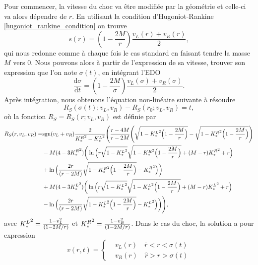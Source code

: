 \documentclass[11pt,a4paper]{article}
\begin{document}
Pour commencer, la vitesse du choc va être modifiée par la géométrie et celle-ci va alors dépendre de $r$. En utilisant la condition d'Hugoniot-Rankine \eqref{hugoniot_rankine_condition} on trouve
\begin{equation}
	s(r) = \left(1-\frac{2M}{r}\right)\frac{v_L(r)+v_R(r)}{2},
\end{equation}
qui nous redonne comme à chaque fois le cas standard en faisant tendre la masse $M$ vers $0$. Nous pouvons alors à partir de l'expression de sa vitesse, trouver son expression que l'on note $\sigma(t)$, en intégrant l'EDO
\begin{equation}
	\frac{\mathrm{d}\sigma}{\mathrm{d}t} = \left(1 - \frac{2M}{\sigma}\right) \frac{v_L(\sigma) + v_R(\sigma)}{2}.
\end{equation}
Après intégration, nous obtenons l'équation non-linéaire suivante à résoudre 
\begin{equation}
R_S(\sigma (t);  v_L, v_R)-  R_S(r_0;  v_L, v_R)= t,
\end{equation}
où la fonction $R_S= R_S(r; v_L, v_{R})$ est définie par  
  \begin{equation}\label{speed-3}
 \aligned 
  R_S(r,  v_L, v_{R})=&  \text{sgn}(v_L+ v_{R}) {2 \over {K_{*}^R}^2-{K_*^L}^2  } \Bigg( {r-4M \over r-2M }\Bigg(\sqrt {{1}- {K_*^L}^2\Big(1- {2M\over r}\Big) } -  \sqrt {{1}- {K_{*}^R}^2\Big(1- {2M\over r}\Big) }\Bigg )
 \\
 & - M({4}- 3{K_{*}^R}^2  )\bigg(  \ln \Big( r \sqrt {{1}- {K_*^L}^2}   \sqrt {{1}- {K_{*}^R}^2 \Big(1- {2M\over r}\Big)  } + ( M-r) {K_{*}^R}^2+{ r}  \Big )
 \\
& +\ln  \Big( {2 r \over (r-2M)}  \sqrt {{1}- {K_{*}^R}^2 \Big(1- {2M\over r}\Big)}- {K_{*}^R}^2\Big )\bigg)
\\
& + M({4}- 3{K_*^L}^2  )\bigg(  \ln \Big( r \sqrt {{1}- {K_*^L}^2}   \sqrt {{1}- {K_*^L}^2 \Big(1- {2M\over r}\Big)  } + ( M-r) {K_*^L}^2+{ r}  \Big )
 \\
& -\ln  \Big( {2 r \over (r-2M)}  \sqrt {{1}- {K_*^L}^2 \Big(1- {2M\over r}\Big)}- {K_*^L}^2\Big )\bigg)
\Bigg), 
 \endaligned 
\end{equation}
avec ${K_*^L}^2= {1 -v_L^2\over (1-2M/r)}$ et $ {K_{*}^R}^2= {1-v_{R}^2\over (1-2M/r)}$.
Dans le cas du choc, la solution a pour expression
\begin{equation}\label{solution_choc}
	v(r,t) = \left\{
	\begin{aligned}
	             &v_L(r)\quad \bar{r} <r< \sigma(t)\\
			     &v_R(r)\quad \hat{r} > r> \sigma(t)
			     \end{aligned}
			\right.
\end{equation}
\end{document}
